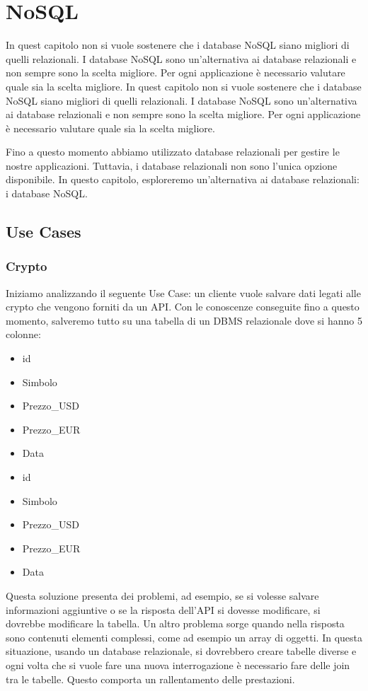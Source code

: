 \chapter{NoSQL}
\begin{nota}
      In quest capitolo non si vuole sostenere che i database NoSQL siano
      migliori di quelli relazionali. I database NoSQL sono un'alternativa
      ai database relazionali e non sempre sono la scelta migliore. Per ogni
      applicazione è necessario valutare quale sia la scelta migliore.
      In quest capitolo non si vuole sostenere che i database NoSQL siano
      migliori di quelli relazionali. I database NoSQL sono un'alternativa
      ai database relazionali e non sempre sono la scelta migliore. Per ogni
      applicazione è necessario valutare quale sia la scelta migliore.
\end{nota}
Fino a questo momento abbiamo utilizzato database relazionali per gestire le
nostre applicazioni. Tuttavia, i database relazionali non sono l'unica
opzione disponibile. In questo capitolo, esploreremo un'alternativa ai
database relazionali: i database NoSQL.
\section*{Use Cases}
\subsection*{Crypto}
Iniziamo analizzando il seguente Use Case: un cliente vuole salvare dati legati
alle crypto che vengono forniti da un API. Con le conoscenze conseguite fino a
questo momento, salveremo tutto su una tabella di un DBMS relazionale dove si
hanno 5 colonne:
\begin{itemize}
      \item id
      \item Simbolo
      \item Prezzo\_USD
      \item Prezzo\_EUR
      \item Data
      \item id
      \item Simbolo
      \item Prezzo\_USD
      \item Prezzo\_EUR
      \item Data
\end{itemize}
Questa soluzione presenta dei problemi, ad esempio, se si volesse salvare
informazioni aggiuntive o se la risposta dell'API si dovesse modificare, si
dovrebbe modificare la tabella. Un altro problema sorge quando nella risposta
sono contenuti elementi complessi, come ad esempio un array di oggetti. In questa
situazione, usando un database relazionale, si dovrebbero creare tabelle diverse
e ogni volta che si vuole fare una nuova interrogazione è necessario fare delle
join tra le tabelle. Questo comporta un rallentamento delle prestazioni.

